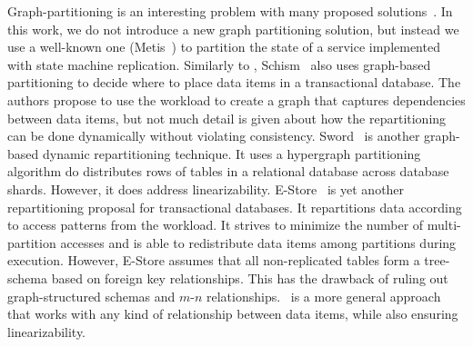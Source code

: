Graph-partitioning is an interesting problem with many proposed solutions~\cite{Abou-Rjeili:2006,kernighan1970efficient,hendrickson2000graph}.
In this work, we do not introduce a new graph partitioning solution, but instead we use a well-known one (Metis~\cite{Abou-Rjeili:2006}) to partition the state of a service implemented with state machine replication.
Similarly to \dynastar{}, Schism~\cite{curino2010sch} also uses graph-based partitioning to decide where to place data items in a transactional database.
The authors propose to use the workload to create a graph that captures dependencies between data items, but not much detail is given about how the repartitioning can be done dynamically without violating consistency.
Sword~\cite{quamar2013sword} is another graph-based dynamic repartitioning technique.
It uses a hypergraph partitioning algorithm do distributes rows of tables in a relational database across database shards.
However, it does address linearizability.
E-Store~\cite{taft2014est} is yet another repartitioning proposal for transactional databases.
It repartitions data according to access patterns from the workload.
It strives to minimize the number of multi-partition accesses and is able to redistribute data items among partitions during execution.
However, E-Store assumes that all non-replicated tables form a tree-schema based on foreign key relationships.
This has the drawback of ruling out graph-structured schemas and \mbox{$m$-$n$} relationships.
\dynastar\ is a more general approach that works with any kind of relationship between data items, while also ensuring linearizability.